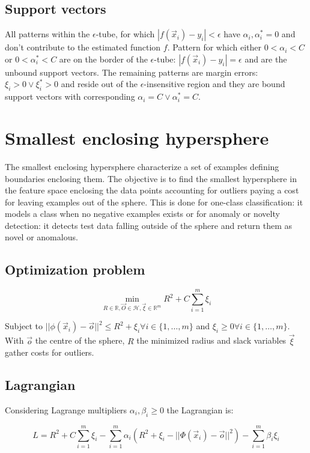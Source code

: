 	\subsection{Support vectors}
	All patterns within the $\epsilon$-tube, for which $|f(\vec{x}_i)-y_i|<\epsilon$ have $\alpha_i, \alpha_i^* = 0$ and don't contribute to the estimated function $f$.
	Pattern for which either $0<\alpha_i<C$ or $0<\alpha_i^*<C$ are on the border of the $\epsilon$-tube: $|f(\vec{x}_i)-y_i| = \epsilon$ and are the unbound support vectors.
	The remaining patterns are margin errors: $\xi_i>0\lor\xi_i^*>0$ and reside out of the $\epsilon$-insensitive region and they are bound support vectors with corresponding $\alpha_i=C\lor\alpha_i^* = C$.

\section{Smallest enclosing hypersphere}
The smallest enclosing hypersphere characterize a set of examples defining boundaries enclosing them.
The objective is to find the smallest hypersphere in the feature space enclosing the data points accounting for outliers paying a cost for leaving examples out of the sphere.
This is done for one-class classification: it models a class when no negative examples exists or for anomaly or novelty detection: it detects test data falling outside of the sphere and return them as novel or anomalous.

	\subsection{Optimization problem}

	$$\min\limits_{R\in\mathbb{R}, \vec{O}\in\mathcal{H},\vec{\xi}\in\mathbb{R}^m} R^2+C\sum\limits_{i=1}^m\xi_i$$

	Subject to $||\phi(\vec{x}_i)-\vec{o}||^2\le R^2+\xi_i\forall i\in\{1, \dots, m\}$ and $\xi_i\ge 0\forall i\in\{1, \dots, m\}$.
	With $\vec{o}$ the centre of the  sphere, $R$ the minimized radius and slack variables $\vec{\xi}$ gather costs for outliers.

	\subsection{Lagrangian}
	Considering Lagrange multipliers $\alpha_i,\beta_i\ge 0$ the Lagrangian is:

	$$L = R^2 + C\sum\limits_{i=1}^m\xi_i-\sum\limits_{i=1}^m\alpha_i(R^2+\xi_i-||\Phi(\vec{x}_i)-\vec{o}||^2)-\sum\limits_{i=1}^m\beta_i\xi_i$$

